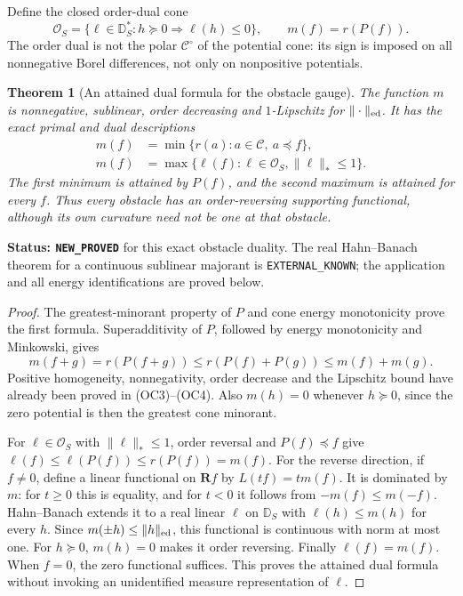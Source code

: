 \documentclass[11pt,a4paper]{article}
\numberwithin{equation}{section}
\newtheorem{theorem}{Theorem}[section]
\theoremstyle{definition}
\theoremstyle{remark}
\begin{document}
Define the closed order-dual cone
\[
 \mathscr O_S=\{\ell\in\mathbb D_S^*:
                  h\succeq0\Longrightarrow\ell(h)\le0\},
 \qquad m(f)=r(P(f)).
 \tag{FO1}
\]
The order dual is not the polar $\mathscr C^\circ$ of the
potential cone: its sign is imposed on all nonnegative Borel
differences, not only on nonpositive potentials.

\begin{theorem}[An attained dual formula for the obstacle gauge]
\label{thm:r12-order-gauge-duality}
The function $m$ is nonnegative, sublinear, order decreasing
and $1$-Lipschitz for $\|\cdot\|_{\rm ed}$.  It has the
exact primal and dual descriptions
\[
 \begin{split}
 m(f)&=\min\{r(a):a\in\mathscr C,\ a\preceq f\},\\
 m(f)&=\max\{\ell(f):\ell\in\mathscr O_S,
                                      \|\ell\|_*\le1\}.
 \end{split}
 \tag{FO2}
\]
The first minimum is attained by $P(f)$, and the second
maximum is attained for every $f$.  Thus every obstacle has
an order-reversing supporting functional, although its own
curvature need not be one at that obstacle.
\end{theorem}

\noindent\textbf{Status: \texttt{NEW\_PROVED}} for this
exact obstacle duality.  The real Hahn--Banach theorem for
a continuous sublinear majorant is \texttt{EXTERNAL\_KNOWN};
the application and all energy identifications are proved below.

\begin{proof}
The greatest-minorant property of $P$ and cone energy
monotonicity prove the first formula.  Superadditivity of
$P$, followed by energy monotonicity and Minkowski, gives
\[
 m(f+g)=r(P(f+g))\le r(P(f)+P(g))\le m(f)+m(g).
\]
Positive homogeneity, nonnegativity, order decrease and the
Lipschitz bound have already been proved in \textup{(OC3)--(OC4)}.
Also $m(h)=0$ whenever $h\succeq0$, since the zero
potential is then the greatest cone minorant.

For $\ell\in\mathscr O_S$ with $\|\ell\|_*\le1$,
order reversal and $P(f)\preceq f$ give
$\ell(f)\le\ell(P(f))\le r(P(f))=m(f)$.
For the reverse direction, if $f\ne0$, define a linear
functional on $\mathbf R f$ by $L(tf)=t m(f)$.
It is dominated by $m$: for $t\ge0$ this is equality,
and for $t<0$ it follows from $-m(f)\le m(-f)$.
Hahn--Banach extends it to a real linear $\ell$ on
$\mathbb D_S$ with $\ell(h)\le m(h)$ for every $h$.
Since $m(\pm h)\le\|h\|_{\rm ed}$, this functional
is continuous with norm at most one.  For $h\succeq0$,
$m(h)=0$ makes it order reversing.  Finally
$\ell(f)=m(f)$.  When $f=0$, the zero functional suffices.
This proves the attained dual formula without invoking
an unidentified measure representation of $\ell$.
\end{proof}
\end{document}
